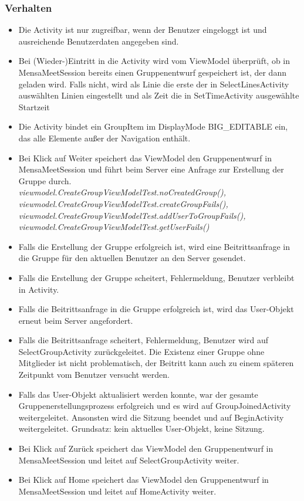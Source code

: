 \documentclass[a4paper]{scrreprt}
\begin{document}
\subsubsection{Verhalten}
\begin{itemize}
\item Die Activity ist nur zugreifbar, wenn der Benutzer eingeloggt ist und ausreichende Benutzerdaten angegeben sind.
\item Bei (Wieder-)Eintritt in die Activity wird vom ViewModel überprüft, ob in MensaMeetSession bereits einen Gruppenentwurf gespeichert ist, der dann geladen wird. Falls nicht, wird als Linie die erste der in SelectLinesActivity auswählten Linien eingestellt und als Zeit die in SetTimeActivity ausgewählte Startzeit
\item Die Activity bindet ein GroupItem im DisplayMode BIG\_EDITABLE ein, das alle Elemente außer der Navigation enthält.
\item Bei Klick auf Weiter speichert das ViewModel den Gruppenentwurf in MensaMeetSession und führt beim Server eine Anfrage zur Erstellung der Gruppe durch. \\
\textit{viewmodel.CreateGroupViewModelTest.noCreatedGroup(),
viewmodel.CreateGroupViewModelTest.createGroupFails(),
viewmodel.CreateGroupViewModelTest.addUserToGroupFails(),
viewmodel.CreateGroupViewModelTest.getUserFails()}
\item Falls die Erstellung der Gruppe erfolgreich ist, wird eine Beitrittsanfrage in die Gruppe für den aktuellen Benutzer an den Server gesendet.
\item Falls die Erstellung der Gruppe scheitert, Fehlermeldung, Benutzer verbleibt in Activity.
\item Falls die Beitrittsanfrage in die Gruppe erfolgreich ist, wird das User-Objekt erneut beim Server angefordert.
\item Falls die Beitrittsanfrage scheitert, Fehlermeldung, Benutzer wird auf SelectGroupActivity zurückgeleitet. Die Existenz einer Gruppe ohne Mitglieder ist nicht problematisch, der Beitritt kann auch zu einem späteren Zeitpunkt vom Benutzer versucht werden. 
\item Falls das User-Objekt aktualisiert werden konnte, war der gesamte Gruppenerstellungsprozess erfolgreich und es wird auf GroupJoinedActivity weitergeleitet. Ansonsten wird die Sitzung beendet und auf BeginActivity weitergeleitet. Grundsatz: kein aktuelles User-Objekt, keine Sitzung.
\item Bei Klick auf Zurück speichert das ViewModel den Gruppenentwurf in MensaMeetSession und leitet auf SelectGroupActivity weiter.
\item Bei Klick auf Home speichert das ViewModel den Gruppenentwurf in MensaMeetSession und leitet auf HomeActivity weiter.

\end{itemize}
\end{document}
